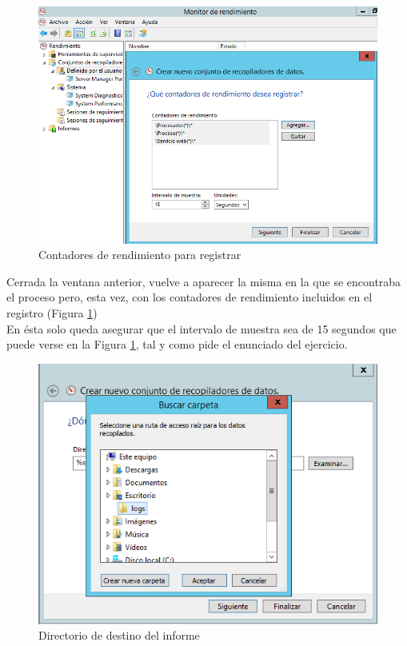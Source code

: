 	\begin{figure}[H] %
		\centering
		\includegraphics[scale=0.55]{figuras/figura14.png} 
		\caption{Contadores de rendimiento para registrar} 
		\label{fig:figura14}
	\end{figure}
	
	Cerrada la ventana anterior, vuelve a aparecer la misma en la que se encontraba el proceso pero, esta vez, con los contadores de rendimiento incluidos en el registro (Figura \ref{fig:figura14})
	\\
	
	En ésta solo queda asegurar que el intervalo de muestra sea de 15 segundos que puede verse en la Figura \ref{fig:figura14}, tal y como pide el enunciado del ejercicio.
	
	\begin{figure}[H] %
		\centering
		\includegraphics[scale=0.6]{figuras/figura15.png} 
		\caption{Directorio de destino del informe} 
		\label{fig:figura15}
	\end{figure}
	
